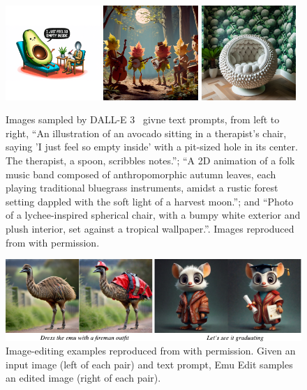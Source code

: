 \begin{figure}[t]
    \centering
    \includegraphics[width=0.32\textwidth]{figs/thesis/dalle3/1.png}
    \hfill
    \includegraphics[width=0.32\textwidth]{figs/thesis/dalle3/2.png}
    \hfill
    \includegraphics[width=0.32\textwidth]{figs/thesis/dalle3/4.png}
    \caption{Images sampled by DALL-E 3~\citep{betker2023improving} givne text prompts, from left to right, ``An illustration of an avocado sitting in a therapist's chair, saying 'I just feel so empty inside' with a pit-sized hole in its center. The therapist, a spoon, scribbles notes.''; ``A 2D animation of a folk music band composed of anthropomorphic autumn leaves, each playing traditional bluegrass instruments, amidst a rustic forest setting dappled with the soft light of a harvest moon.''; and ``Photo of a lychee-inspired spherical chair, with a bumpy white exterior and plush interior, set against a tropical wallpaper.''. Images reproduced from \citet{betker2023improving} with permission.}
    \label{fig:dalle-3-samples}
    \centering
    \includegraphics{figs/thesis/emu_edit_examples.pdf}
    \caption{Image-editing examples reproduced from \citet{sheynin2023emu} with permission. Given an input image (left of each pair) and text prompt, Emu Edit samples an edited image (right of each pair).}
    \label{fig:emu-edit-samples}
\end{figure}


